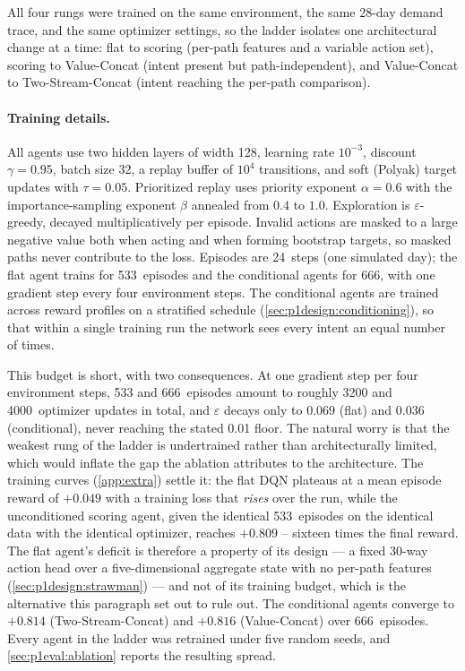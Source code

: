 All four rungs were trained on the same environment, the same 28-day demand trace, and the same
optimizer settings, so the ladder isolates one architectural change at a time: flat to scoring
(per-path features and a variable action set), scoring to Value-Concat (intent present but
path-independent), and Value-Concat to Two-Stream-Concat (intent reaching the per-path comparison).

\paragraph{Training details.} All agents use two hidden layers of width 128, learning rate $10^{-3}$,
discount $\gamma = 0.95$, batch size 32, a replay buffer of $10^4$ transitions, and soft (Polyak) target
updates with $\tau = 0.05$. Prioritized replay uses priority exponent $\alpha = 0.6$ with the
importance-sampling exponent $\beta$ annealed from $0.4$ to $1.0$. Exploration is $\varepsilon$-greedy,
decayed multiplicatively per episode. Invalid actions are masked to a large negative value both when
acting and when forming bootstrap targets, so masked paths never contribute to the loss. Episodes are
24~steps (one simulated day); the flat agent trains for 533~episodes and the conditional agents for 666,
with one gradient step every four environment steps. The conditional agents are trained across
reward profiles on a stratified schedule (\cref{sec:p1design:conditioning}), so that within a single training run
the network sees every intent an equal number of times.

This budget is short, with two consequences. At one gradient step
per four environment steps, 533 and 666~episodes amount to roughly 3200 and 4000~optimizer updates in
total, and $\varepsilon$ decays only to 0.069 (flat) and 0.036 (conditional), never reaching the stated
0.01 floor. The natural worry is that the weakest rung of the ladder is undertrained rather than
architecturally limited, which would inflate the gap the ablation attributes to the architecture. The
training curves (\cref{app:extra}) settle it: the flat DQN plateaus at a mean episode reward of
$+0.049$ with a training loss that \emph{rises} over the run, while the unconditioned scoring agent,
given the identical 533~episodes on the identical data with the identical optimizer, reaches $+0.809$ --
sixteen times the final reward. The flat agent's deficit is therefore a property of its design --- a fixed
30-way action head over a five-dimensional aggregate state with no per-path features
(\cref{sec:p1design:strawman}) --- and not of its training budget, which is the alternative this
paragraph set out to rule out.
The conditional agents converge to $+0.814$ (Two-Stream-Concat) and $+0.816$ (Value-Concat) over
666~episodes. Every agent in the ladder was retrained under five random seeds, and
\cref{sec:p1eval:ablation} reports the resulting spread.

